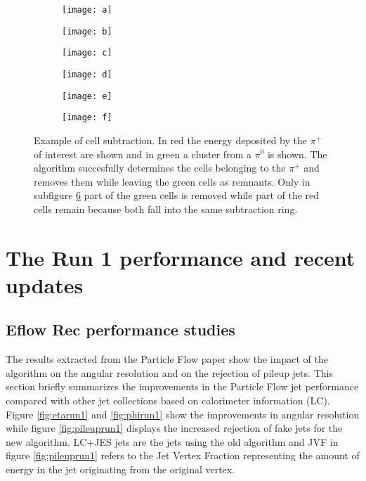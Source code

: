 \begin{figure}[htbp]
  \centering
  \begin{subfigure}[b]{0.3\figwidth}
    \texttt{[image: a]}
    \caption{}\label{fig:sub-a}
  \end{subfigure}
  \begin{subfigure}[b]{0.3\figwidth}
    \texttt{[image: b]}
    \caption{}\label{fig:sub-b}
  \end{subfigure}
  \begin{subfigure}[b]{0.3\figwidth}
    \texttt{[image: c]}
    \caption{}\label{fig:sub-c}
  \end{subfigure}
  \begin{subfigure}[b]{0.3\figwidth}
    \texttt{[image: d]}
    \caption{}\label{fig:sub-d}
  \end{subfigure}
    
    
  \begin{subfigure}[b]{0.3\figwidth}
        \texttt{[image: e]}
        \caption{}\label{fig:sub-e}
  \end{subfigure}
  \begin{subfigure}[b]{0.3\figwidth}
        \texttt{[image: f]}
        \caption{}\label{fig:sub-f}
  \end{subfigure}
  \caption{Example of cell subtraction. In red the energy deposited by the $\pi ^+$ of interest are shown and in green a cluster from a $\pi ^0$ is shown. The algorithm succesfully determines the cells belonging to the $\pi ^+$ and removes them while leaving the green cells as remnants. Only in subfigure \ref{fig:sub-f} part of the green cells is removed while part of the red cells remain because both fall into the same subtraction ring. \cite{pflow16}}
  \label{fig:sub}
\end{figure}


\section{The Run 1 performance and recent updates}

\subsection{Eflow Rec performance studies}

The results extracted from the Particle Flow paper \cite{pflow16} show the impact of the algorithm on the angular resolution and on the rejection of pileup jets. This section briefly summarizes the improvements in the Particle Flow jet performance compared with other jet collections based on calorimeter information (LC). Figure \ref{fig:etarun1} and \ref{fig:phirun1} show the improvements in angular resolution while figure \ref{fig:pileuprun1} displays the increased rejection of fake jets for the new algorithm. LC+JES jets are the jets using the old algorithm and JVF in figure \ref{fig:pileuprun1} refers to the Jet Vertex Fraction representing the amount of energy in the jet originating from the original vertex.

